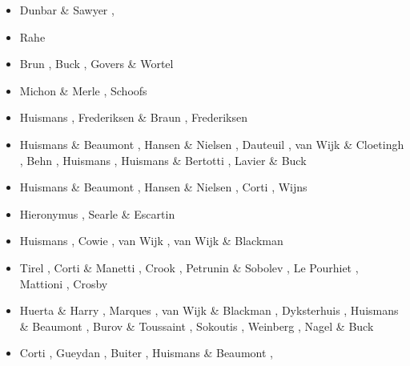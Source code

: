 \begin{scriptsize}
\begin{itemize}
\item[\nineteenninetysix] Dunbar \& Sawyer \cite{dusa96}, \cite{beda96}\cite{mada96}
\item[\nineteenninetyeight] Rahe \etal \cite{rafm98}
\item[\nineteenninetynine] Brun \cite{brun99}, Buck \etal \cite{bulp99},
                           Govers \& Wortel \cite{gowo99}
\item[\twothousand] Michon \& Merle \cite{mime00}, Schoofs \etal \cite{scth00}
\item[\twothousandone] Huismans \etal \cite{hupc01,hupc01b}, Frederiksen \& Braun \cite{frbr01}, 
                       Frederiksen \etal \cite{frnb01a,frnb01b}
\item[\twothousandtwo] Huismans \& Beaumont \cite{hube02}, Hansen \& Nielsen \cite{hani02},
                       Dauteuil \etal \cite{dabm02}, van Wijk \& Cloetingh \cite{vacl02},
                       Behn \etal \cite{belz02}, Huismans \etal \cite{hupc02},
                       Huismans \& Bertotti \cite{hube02b}, Lavier \& Buck \cite{labu02}
\item[\twothousandthree] Huismans \& Beaumont \cite{hube03}, Hansen \& Nielsen \cite{hani03},
                         Corti \etal \cite{covb03}, Wijns \etal \cite{wibm03}
\item[\twothousandfour] Hieronymus \cite{hier04}, Searle \& Escartin \cite{sees04}
\item[\twothousandfive] Huismans \etal \cite{hubb05}, Cowie \etal \cite{coub05},
                        van Wijk \cite{vanw05}, van Wijk \& Blackman \cite{vabl05}
\item[\twothousandsix] Tirel \etal \cite{tibs06}, Corti \& Manetti \cite{coma06},
                       Crook \etal \cite{crwy06}, Petrunin \& Sobolev \cite{peso06},
                       Le Pourhiet \etal \cite{lemm06}, Mattioni \etal \cite{malm06}, 
                       Crosby \etal \cite{crms06}
\item[\twothousandseven] Huerta \& Harry \cite{huha07}, Marques \etal \cite{macl07},
                         van Wijk \& Blackman \cite{vabl07}, Dyksterhuis \etal \cite{dyrm07},
                         Huismans \& Beaumont \cite{hube07}, Burov \& Toussaint \cite{buto07},
                         Sokoutis \etal \cite{socb07}, Weinberg \etal \cite{werr07},
                         Nagel \& Buck \cite{nabu07}
\item[\twothousandeight] Corti \cite{cort08}, Gueydan \etal \cite{gumb08},
                         Buiter \etal \cite{buhb08}, Huismans \& Beaumont \cite{hube08},

\end{itemize}
\end{scriptsize}
